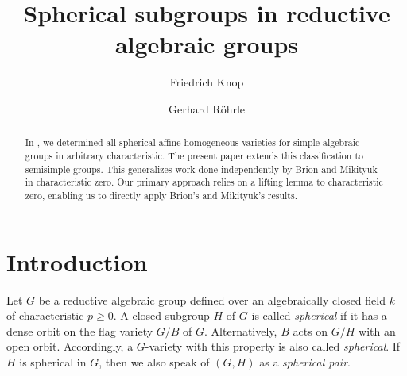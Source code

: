 \documentclass[12pt]{amsart}
\numberwithin{equation}{section}
\theoremstyle{definition}
\begin{document}
\title[Spherical subgroups in reductive algebraic groups]
{Spherical subgroups in reductive algebraic groups}


\author[F. Knop]{Friedrich Knop}
\address
{Department Mathematik,
FAU Erlangen-Nürnberg,
Cauerstraße 11,
91058 Erlangen, Germany}


\author[G. Röhrle]{Gerhard Röhrle}
\address
{Fakultät für Mathematik,
Ruhr-Universität Bochum,
D-44780 Bochum, Germany}


\allowdisplaybreaks

\begin{abstract}
	In \cite{KR}, we determined all spherical affine homogeneous varieties for simple algebraic groups in arbitrary characteristic. The present paper extends this classification to semisimple groups. This generalizes work done independently by Brion and Mikityuk in characteristic zero. Our primary approach relies on a lifting lemma to characteristic zero, enabling us to directly apply Brion's and Mikityuk's results.
\end{abstract}

\maketitle


\section{Introduction}

Let $G$ be a reductive algebraic group defined over an algebraically
closed field $k$ of characteristic $p\geqslant0$.  A closed subgroup $H$ of
$G$ is called \emph{spherical} if it has a dense orbit on the
flag variety $G/B$ of $G$.  Alternatively, $B$ acts on $G/H$ with an
open orbit.  Accordingly, a $G$-variety with this property is
also called \emph{spherical}.  If $H$ is spherical in $G$, then we
also speak of $(G,H)$ as a \emph{spherical pair}.
 
\end{document}
